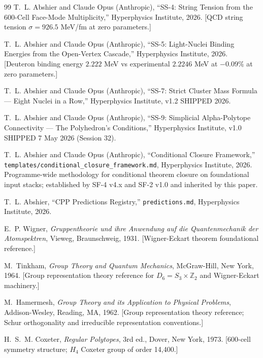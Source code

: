 \documentclass[11pt,letterpaper]{article}
\newcommand{\Dsix}{D_6}
\newcommand{\Sthree}{S_3}
\newcommand{\Hfour}{H_4}
\begin{document}
\begin{thebibliography}{99}
 T.~L. Abshier and Claude Opus (Anthropic), ``SS-4: String Tension from the 600-Cell Face-Mode Multiplicity,'' Hyperphysics Institute, 2026. [QCD string tension $\sigma = 926.5$ MeV/fm at zero parameters.]

 T.~L. Abshier and Claude Opus (Anthropic), ``SS-5: Light-Nuclei Binding Energies from the Open-Vertex Cascade,'' Hyperphysics Institute, 2026. [Deuteron binding energy $2.222$ MeV vs experimental $2.2246$ MeV at $-0.09\%$ at zero parameters.]

 T.~L. Abshier and Claude Opus (Anthropic), ``SS-7: Strict Cluster Mass Formula --- Eight Nuclei in a Row,'' Hyperphysics Institute, v1.2 SHIPPED 2026.

 T.~L. Abshier and Claude Opus (Anthropic), ``SS-9: Simplicial Alpha-Polytope Connectivity --- The Polyhedron's Conditions,'' Hyperphysics Institute, v1.0 SHIPPED 7 May 2026 (Session 32).

 T.~L. Abshier and Claude Opus (Anthropic), ``Conditional Closure Framework,'' \texttt{templates/conditional\_closure\_framework.md}, Hyperphysics Institute, 2026. Programme-wide methodology for conditional theorem closure on foundational input stacks; established by SF-4 v4.x and SF-2 v1.0 and inherited by this paper.

 T.~L. Abshier, ``CPP Predictions Registry,'' \texttt{predictions.md}, Hyperphysics Institute, 2026.

 E.~P. Wigner, \textit{Gruppentheorie und ihre Anwendung auf die Quantenmechanik der Atomspektren}, Vieweg, Braunschweig, 1931. [Wigner-Eckart theorem foundational reference.]

 M.~Tinkham, \textit{Group Theory and Quantum Mechanics}, McGraw-Hill, New York, 1964. [Group representation theory reference for $\Dsix = \Sthree \times \mathbb{Z}_2$ and Wigner-Eckart machinery.]

 M.~Hamermesh, \textit{Group Theory and its Application to Physical Problems}, Addison-Wesley, Reading, MA, 1962. [Group representation theory reference; Schur orthogonality and irreducible representation conventions.]

 H.~S.~M. Coxeter, \textit{Regular Polytopes}, 3rd ed., Dover, New York, 1973. [600-cell symmetry structure; $\Hfour$ Coxeter group of order 14{,}400.]


\end{thebibliography}
\end{document}
